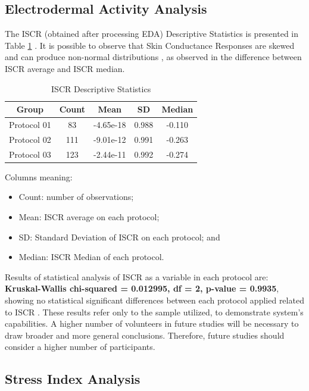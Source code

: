\subsection{{Electrodermal Activity  Analysis}}

The ISCR (obtained after processing EDA) Descriptive Statistics is presented in Table \ref{table:tbISCR} \cite{braithwaite2015}. It is possible to observe that Skin Conductance Responses are skewed and can produce non-normal distributions \cite{braithwaite2015}, as observed in the difference between ISCR average and ISCR median.


\begin{table}[!htb]
\caption {ISCR Descriptive Statistics}\label{table:tbISCR}
\centering
\begin{tabular}{ccccc}
\toprule
Group & Count & Mean &SD & Median \\
\midrule
Protocol 01 &  83 & -4.65e-18 & 0.988 & -0.110 \\
Protocol 02 & 111 & -9.01e-12 & 0.991 & -0.263 \\
Protocol 03 & 123 & -2.44e-11 & 0.992 & -0.274 \\
\bottomrule
\end{tabular}
\end{table}

Columns meaning:

\begin{itemize}
\item Count: number of observations;
\item Mean: ISCR average on each protocol;
\item SD: Standard Deviation of ISCR on each protocol; and
\item Median: ISCR Median of each protocol.
\end{itemize}

Results of statistical analysis of ISCR as a variable in each protocol are: \textbf{Kruskal-Wallis chi-squared = 0.012995, df = 2, p-value = 0.9935}, showing no statistical significant differences between each protocol applied related to ISCR \cite{bodkin2019}.
These results refer only to the sample utilized, to demonstrate system's capabilities. A higher number of volunteers in future studies will be necessary to draw broader and more general conclusions. Therefore, future studies should consider a higher number of participants.
\newline


\subsection{Stress Index Analysis}

